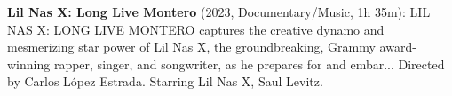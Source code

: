 \textbf{Lil Nas X: Long Live Montero} (2023, Documentary/Music, 1h 35m): LIL NAS X: LONG LIVE MONTERO captures the creative dynamo and mesmerizing star power of Lil Nas X, the groundbreaking, Grammy award-winning rapper, singer, and songwriter, as he prepares for and embar... Directed by Carlos L\'opez Estrada. Starring Lil Nas X, Saul Levitz.